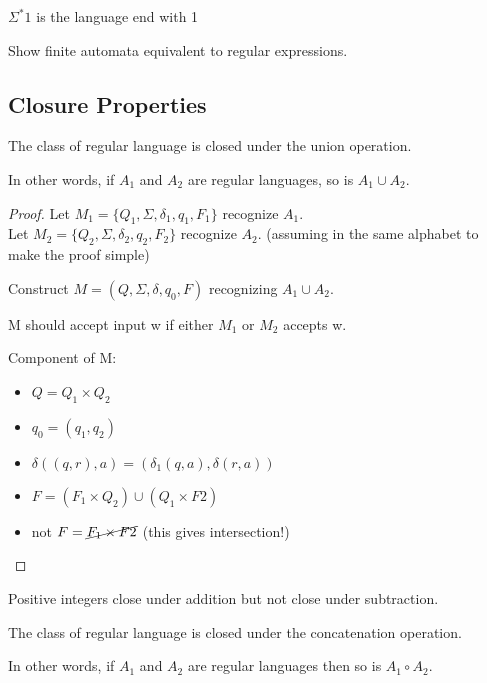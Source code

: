 \begin{eg}
    \(\Sigma^*1\) is the language end with 1
\end{eg}

\begin{remark}
    Show finite automata equivalent to regular expressions.
\end{remark}

\subsection{Closure Properties}\label{theorem: clousre properties union}
\begin{theorem}
    The class of regular language is closed under the union operation.

    In other words, if \(A_1\) and \(A_2\) are regular languages, so is \(A_1 \cup A_2\).   
\end{theorem}
\begin{proof}
    Let \(M_1 = \{ Q_1, \Sigma, \delta_1, q_1, F_1 \} \)  recognize \(A_1\). \\
    Let \(M_2 = \{ Q_2, \Sigma, \delta_2, q_2, F_2 \} \)  recognize \(A_2\). 
    (assuming in the same alphabet to make the proof simple)

    Construct \(M = (Q, \Sigma, \delta, q_0, F)\) recognizing \(A_1 \cup A_2\).  

    M should accept input w if either \(M_1\)  or \(M_2\)  accepts w.

    Component of M:
    \begin{itemize}
        \item \(Q = Q_1 \times Q_2\) 
        \item \(q_0 = (q_1, q_2)\) 
        \item \(\delta((q, r), a) = (\delta_1(q, a), \delta(r, a))\) 
        \item \(F = (F_1 \times Q_2) \cup (Q_1 \times F2)\) 
        \item  not \(F = \cancel{F_1 \times F2}\) (this gives intersection!) 
    \end{itemize}
\end{proof}

\begin{eg}
    Positive integers close under addition but not close under subtraction.
\end{eg}

\begin{theorem}\label{theorem: clousre properties concat}
    The class of regular language is closed under the concatenation operation.

    In other words, if \(A_1\) and \(A_2\) are regular languages then so is \(A_1 \circ A_2\).   
\end{theorem}


